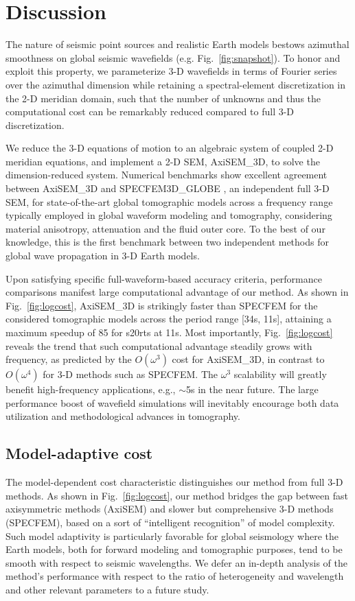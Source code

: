 \documentclass[extra]{gji}
\begin{document}
\section{Discussion}
The nature of seismic point sources and realistic Earth models 
bestows azimuthal smoothness on global seismic wavefields (e.g. Fig.~\ref{fig:snapshot}). 
To honor and exploit this property, we parameterize 3-D wavefields
in terms of Fourier series over the azimuthal dimension while
retaining a spectral-element discretization in the 2-D meridian domain,
such that the number of unknowns and thus the computational cost 
can be remarkably reduced compared to full 3-D discretization.

We reduce the 3-D equations of motion to 
an algebraic system of coupled 2-D meridian equations,
and implement a 2-D SEM, AxiSEM\_3D, to solve the dimension-reduced system.
Numerical benchmarks show excellent agreement 
between AxiSEM\_3D and SPECFEM3D\_GLOBE 
\cite[]{komatitsch2002spectralI,komatitsch2002spectralII},
an independent full 3-D SEM, 
for state-of-the-art global tomographic models
across a frequency range typically employed in global waveform modeling 
and tomography, considering material anisotropy, attenuation and the fluid outer core. 
To the best of our knowledge, this is the first benchmark
between two independent methods for global wave propagation in 3-D Earth models. 

Upon satisfying specific full-waveform-based accuracy criteria, 
performance comparisons manifest large computational advantage of our method.
As shown in Fig.~\ref{fig:logcost}, AxiSEM\_3D is strikingly faster than SPECFEM
for the considered tomographic models across the period range [34s, 11s], 
attaining a maximum speedup of 85 for s20rts at 11s. 
Most importantly, Fig.~\ref{fig:logcost} reveals the trend that such 
computational advantage steadily grows with frequency, 
as predicted by the $O(\omega^3)$ cost
for AxiSEM\_3D, in contrast to $O(\omega^4)$ for 3-D methods such as SPECFEM.
The $\omega^3$ scalability will greatly benefit high-frequency applications,
e.g., $\sim$5s in the near future. 
The large performance boost of wavefield simulations will inevitably 
encourage both data utilization and methodological advances in tomography.  

\subsection{Model-adaptive cost}
\label{sec:adapt}
The model-dependent cost characteristic distinguishes our method from 
full 3-D methods. As shown in Fig.~\ref{fig:logcost}, our method 
bridges the gap between fast axisymmetric methods (AxiSEM) and 
slower but comprehensive 3-D methods (SPECFEM), based on a sort of 
``intelligent recognition'' of model complexity. Such model adaptivity
is particularly favorable for global seismology where 
the Earth models, both for forward modeling and tomographic purposes,  
tend to be smooth with respect to seismic wavelengths. 
We defer an in-depth analysis of the method's performance with respect to 
the ratio of heterogeneity and wavelength and other relevant 
parameters to a future study.
\end{document}

